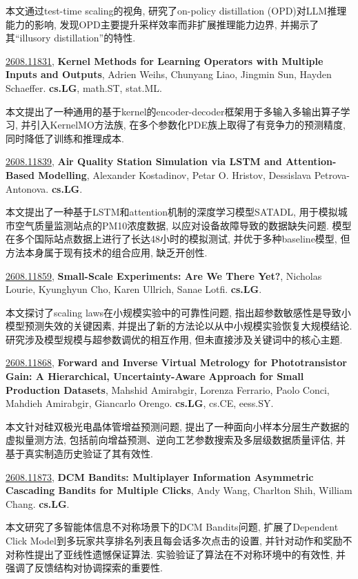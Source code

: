 \documentclass[9pt, a4paper]{article}
\theoremstyle{plain}
\theoremstyle{definition}
\theoremstyle{remark}
\newcommand{\arxivwithtarget}[3]{\hypertarget{#1}{}\href{https://arxiv.org/abs/#1}{#1}, \textbf{\textcolor{arxivblue}{#2}}, #3. }
\begin{document}
本文通过test-time scaling的视角, 研究了on-policy distillation (OPD)对LLM推理能力的影响, 发现OPD主要提升采样效率而非扩展推理能力边界, 并揭示了其“illusory distillation”的特性.


\arxivwithtarget{2608.11831}{Kernel Methods for Learning Operators with Multiple Inputs and Outputs}{Adrien Weihs, Chunyang Liao, Jingmin Sun, Hayden Schaeffer}\textbf{cs.LG}, math.ST, stat.ML.

本文提出了一种通用的基于kernel的encoder-decoder框架用于多输入多输出算子学习, 并引入KernelMO方法族, 在多个参数化PDE族上取得了有竞争力的预测精度, 同时降低了训练和推理成本.


\arxivwithtarget{2608.11839}{Air Quality Station Simulation via LSTM and Attention-Based Modelling}{Alexander Kostadinov, Petar O. Hristov, Dessislava Petrova-Antonova}\textbf{cs.LG}.

本文提出了一种基于LSTM和attention机制的深度学习模型SATADL, 用于模拟城市空气质量监测站点的PM10浓度数据, 以应对设备故障导致的数据缺失问题. 模型在多个国际站点数据上进行了长达48小时的模拟测试, 并优于多种baseline模型, 但方法本身属于现有技术的组合应用, 缺乏开创性.


\arxivwithtarget{2608.11859}{Small-Scale Experiments: Are We There Yet?}{Nicholas Lourie, Kyunghyun Cho, Karen Ullrich, Sanae Lotfi}\textbf{cs.LG}.

本文探讨了scaling laws在小规模实验中的可靠性问题, 指出超参数敏感性是导致小模型预测失效的关键因素, 并提出了新的方法论以从中小规模实验恢复大规模结论. 研究涉及模型规模与超参数调优的相互作用, 但未直接涉及关键词中的核心主题.


\arxivwithtarget{2608.11868}{Forward and Inverse Virtual Metrology for Phototransistor Gain: A Hierarchical, Uncertainty-Aware Approach for Small Production Datasets}{Mahshid Amirabgir, Lorenza Ferrario, Paolo Conci, Mahdieh Amirabgir, Giancarlo Orengo}\textbf{cs.LG}, cs.CE, eess.SY.

本文针对硅双极光电晶体管增益预测问题, 提出了一种面向小样本分层生产数据的虚拟量测方法, 包括前向增益预测、逆向工艺参数搜索及多层级数据质量评估, 并基于真实制造历史验证了其有效性.


\arxivwithtarget{2608.11873}{DCM Bandits: Multiplayer Information Asymmetric Cascading Bandits for Multiple Clicks}{Andy Wang, Charlton Shih, William Chang}\textbf{cs.LG}.

本文研究了多智能体信息不对称场景下的DCM Bandits问题, 扩展了Dependent Click Model到多玩家共享排名列表且每会话多次点击的设置, 并针对动作和奖励不对称性提出了亚线性遗憾保证算法. 实验验证了算法在不对称环境中的有效性, 并强调了反馈结构对协调探索的重要性.
\end{document}
